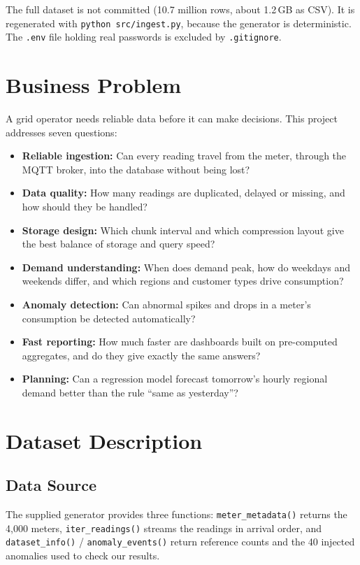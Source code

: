 \documentclass[11pt,a4paper]{article}
\begin{document}
The full dataset is not committed (10.7 million rows, about 1.2\,GB as CSV). It is regenerated with \texttt{python src/ingest.py}, because the generator is deterministic. The \texttt{.env} file holding real passwords is excluded by \texttt{.gitignore}.

\section{Business Problem}

A grid operator needs reliable data before it can make decisions. This project addresses seven questions:

\begin{itemize}
\item \textbf{Reliable ingestion:} Can every reading travel from the meter, through the MQTT broker, into the database without being lost?
\item \textbf{Data quality:} How many readings are duplicated, delayed or missing, and how should they be handled?
\item \textbf{Storage design:} Which chunk interval and which compression layout give the best balance of storage and query speed?
\item \textbf{Demand understanding:} When does demand peak, how do weekdays and weekends differ, and which regions and customer types drive consumption?
\item \textbf{Anomaly detection:} Can abnormal spikes and drops in a meter's consumption be detected automatically?
\item \textbf{Fast reporting:} How much faster are dashboards built on pre-computed aggregates, and do they give exactly the same answers?
\item \textbf{Planning:} Can a regression model forecast tomorrow's hourly regional demand better than the rule ``same as yesterday''?
\end{itemize}

\section{Dataset Description}

\subsection{Data Source}

The supplied generator provides three functions: \texttt{meter\_metadata()} returns the 4,000 meters, \texttt{iter\_readings()} streams the readings in arrival order, and \texttt{dataset\_info()} / \texttt{anomaly\_events()} return reference counts and the 40 injected anomalies used to check our results.
\end{document}
